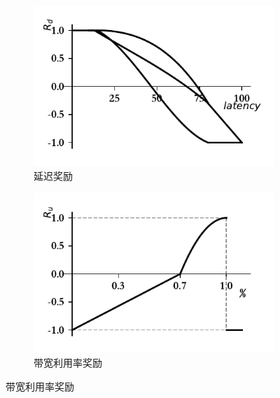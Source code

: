 \begin{figure}[ht]
\centering
\begin{subfigure}[t]{0.5\linewidth}
  \centering
  \includegraphics[width=\linewidth]{figures/chap03/reward_function/Rd.pdf}
  \caption{延迟奖励}
  \label{fig:Latency Reward}
\end{subfigure}%
\begin{subfigure}[t]{0.5\linewidth}
  \centering
  \includegraphics[width=\linewidth]{figures/chap03/reward_function/Ru.pdf}
  \caption{带宽利用率奖励}
  \label{fig:Bandwidth Utilization Reward}
\end{subfigure}


\end{figure}
